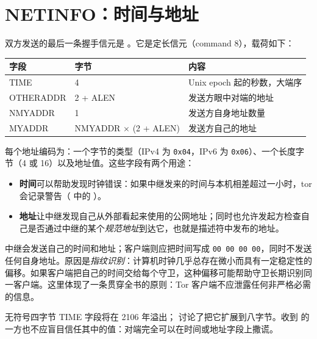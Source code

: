 \section{NETINFO：时间与地址}\label{sec:canale-netinfo}

双方发送的最后一条握手信元是 。它是定长信元（command 8），载荷如下：

\begin{center}
\begin{tabularx}{\textwidth}{@{}ll>{\raggedright\arraybackslash}X@{}}
\toprule
字段 & 字节 & 内容 \\
\midrule
TIME & 4 & Unix epoch 起的秒数，大端序 \\
OTHERADDR & 2 + ALEN & 发送方眼中对端的地址 \\
NMYADDR & 1 & 发送方自身地址数量 \\
MYADDR & NMYADDR $\times$ (2 + ALEN) & 发送方自己的地址 \\
\bottomrule
\end{tabularx}
\end{center}

每个地址编码为：一个字节的类型（IPv4 为 \texttt{0x04}，IPv6 为 \texttt{0x06}）、一个长度字节（4 或 16）以及地址值。这些字段有两个用途：
\begin{itemize}
  \item \textbf{时间}可以帮助发现时钟错误：如果中继发来的时间与本机相差超过一小时，tor 会记录警告（ 中的 ）。
  \item \textbf{地址}让中继发现自己从外部看起来使用的公网地址；同时也允许发起方检查自己是否通过中继的某个\emph{规范地址}到达它，也就是描述符中发布的地址。
\end{itemize}

\begin{attenzione}[客户端不会泄露自己的时钟]
中继会发送自己的时间和地址；客户端则应把时间写成 \texttt{00 00 00 00}，同时不发送任何自身地址。原因是\emph{指纹识别}：计算机时钟几乎总存在微小而具有一定稳定性的偏移。如果客户端把自己的时间交给每个守卫，这种偏移可能帮助守卫长期识别同一客户端。这里体现了一条贯穿全书的原则：Tor 客户端不应泄露任何非严格必需的信息。
\end{attenzione}

无符号四字节 TIME 字段将在 2106 年溢出； 讨论了把它扩展到八字节。收到  的一方也不应盲目信任其中的值：对端完全可以在时间或地址字段上撒谎。


